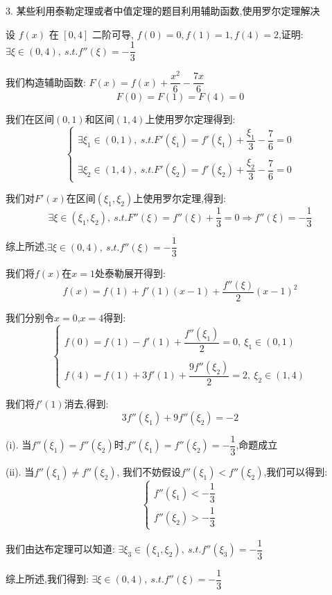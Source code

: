 3. 某些利用泰勒定理或者中值定理的题目利用辅助函数,使用罗尔定理解决
\begin{proposition}
	设 $f(x)$ 在 $[0,4]$ 二阶可导, $f(0)=0,f(1)=1,f(4)=2$,证明: $\exists \xi\in(0,4),\ s.t. f''(\xi)=-\dfrac{1}{3}$
\end{proposition}
\begin{solution}

	我们构造辅助函数:  $F(x)=f(x)+\dfrac{x^2}{6}-\dfrac{7x}{6}$
	$$F(0)=F(1)=F(4)=0$$

	我们在区间$(0,1)$和区间$(1,4)$上使用罗尔定理得到:
	$$\left\lbrace
		\begin{array}{l}
			\exists \xi_{1}\in(0,1),\ s.t. F'(\xi_{1})=f'(\xi_{1})+\dfrac{\xi_{1}}{3}-\dfrac{7}{6}=0 \\

			\\
			\exists \xi_{2}\in(1,4),\ s.t. F'(\xi_{2})=f'(\xi_{2})+\dfrac{\xi_{2}}{3}-\dfrac{7}{6}=0
		\end{array}
		\right.$$

	我们对$F'(x)$在区间$(\xi_{1},\xi_{2})$上使用罗尔定理,得到:
	$$\exists \xi\in(\xi_{1},\xi_{2}),\ s.t. F''(\xi)=f''(\xi)+\dfrac{1}{3}=0\Rightarrow f''(\xi)=-\dfrac{1}{3}$$

	综上所述,$\exists \xi\in(0,4),\ s.t. f''(\xi)=-\dfrac{1}{3}$
\end{solution}
\begin{anymark}[注: 泰勒展开]
	我们将$f(x)$在$x=1$处泰勒展开得到:
	$$f(x)=f(1)+f'(1)(x-1)+\dfrac{f''(\xi)}{2}(x-1)^2$$

	我们分别令$x=0$,$x=4$得到:
	$$\left\lbrace
		\begin{array}{l}
			f(0)=f(1)-f'(1)+\dfrac{f''(\xi_{1})}{2}=0,\ \xi_{1}\in(0,1) \\
			\\
			f(4)=f(1)+3f'(1)+\dfrac{9f''(\xi_{2})}{2}=2,\ \xi_{2}\in(1,4)
		\end{array}
		\right. $$

	我们将$f'(1)$消去,得到:
	$$3f''(\xi_{1})+9f''(\xi_{2})=-2$$

	(i). 当$f''(\xi_{1})=f''(\xi_{2})$时,$f''(\xi_{1})=f''(\xi_{2})=-\dfrac{1}{3}$,命题成立

	(ii). 当$f''(\xi_{1})\neq f''(\xi_{2})$, 我们不妨假设$f''(\xi_{1})<f''(\xi_{2})$,我们可以得到:
	$$\left\lbrace
		\begin{array}{l}
			f''(\xi_{1})<-\dfrac{1}{3} \\
			f''(\xi_{2})>-\dfrac{1}{3}
		\end{array}
		\right. $$

	我们由达布定理可以知道: $\exists \xi_{3}\in(\xi_{1},\xi_{2}),\ s.t. f''(\xi_{3})=-\dfrac{1}{3}$

	综上所述,我们得到: $\exists\xi\in(0,4),\ s.t. f''(\xi)=-\dfrac{1}{3}$
\end{anymark}

